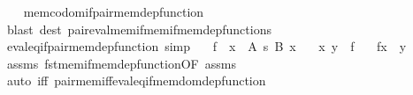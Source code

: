 \begin{isabellebody}
%
\isadelimproof
\ \ %
\endisadelimproof
%
\isatagproof
{}\isamarkupfalse%
\ mem{\isacharunderscore}{\kern0pt}codom{\isacharunderscore}{\kern0pt}if{\isacharunderscore}{\kern0pt}pair{\isacharunderscore}{\kern0pt}mem{\isacharunderscore}{\kern0pt}dep{\isacharunderscore}{\kern0pt}function\isanewline
\ \ \isamarkupfalse%
\ {\isacharparenleft}{\kern0pt}blast\ dest{\isacharcolon}{\kern0pt}\ pair{\isacharunderscore}{\kern0pt}eval{\isacharunderscore}{\kern0pt}mem{\isacharunderscore}{\kern0pt}if{\isacharunderscore}{\kern0pt}mem{\isacharunderscore}{\kern0pt}if{\isacharunderscore}{\kern0pt}mem{\isacharunderscore}{\kern0pt}dep{\isacharunderscore}{\kern0pt}functions{\isacharparenright}{\kern0pt}%
\endisatagproof
{\isafoldproof}%
%
\isadelimproof
\isanewline
%
\endisadelimproof
\isanewline
{}\isamarkupfalse%
\ eval{\isacharunderscore}{\kern0pt}eq{\isacharunderscore}{\kern0pt}if{\isacharunderscore}{\kern0pt}pair{\isacharunderscore}{\kern0pt}mem{\isacharunderscore}{\kern0pt}dep{\isacharunderscore}{\kern0pt}function\ {\isacharbrackleft}{\kern0pt}simp{\isacharbrackright}{\kern0pt}{\isacharcolon}{\kern0pt}\isanewline
\ \ \ {\isachardoublequoteopen}f\ {\isasymin}\ {\isacharparenleft}{\kern0pt}x\ {\isasymin}\ A{\isacharparenright}{\kern0pt}\ {\isasymrightarrow}s\ {\isacharparenleft}{\kern0pt}B\ x{\isacharparenright}{\kern0pt}{\isachardoublequoteclose}\isanewline
\ \ \ {\isachardoublequoteopen}{\isasymlangle}x{\isacharcomma}{\kern0pt}\ y{\isasymrangle}\ {\isasymin}\ f{\isachardoublequoteclose}\isanewline
\ \ \ {\isachardoublequoteopen}f{\isacharbackquote}{\kern0pt}x\ {\isacharequal}{\kern0pt}\ y{\isachardoublequoteclose}\isanewline
%
\isadelimproof
\ \ %
\endisadelimproof
%
\isatagproof
{}\isamarkupfalse%
\ assms\ fst{\isacharunderscore}{\kern0pt}mem{\isacharunderscore}{\kern0pt}if{\isacharunderscore}{\kern0pt}mem{\isacharunderscore}{\kern0pt}dep{\isacharunderscore}{\kern0pt}function{\isacharbrackleft}{\kern0pt}OF\ assms{\isacharbrackright}{\kern0pt}\isanewline
\ \ \ \ \isamarkupfalse%
\ {\isacharparenleft}{\kern0pt}auto\ iff{\isacharcolon}{\kern0pt}\ pair{\isacharunderscore}{\kern0pt}mem{\isacharunderscore}{\kern0pt}iff{\isacharunderscore}{\kern0pt}eval{\isacharunderscore}{\kern0pt}eq{\isacharunderscore}{\kern0pt}if{\isacharunderscore}{\kern0pt}mem{\isacharunderscore}{\kern0pt}dom{\isacharunderscore}{\kern0pt}dep{\isacharunderscore}{\kern0pt}function{\isacharparenright}{\kern0pt}%
\endisatagproof
{\isafoldproof}%
%
\isadelimproof
\isanewline
%
\endisadelimproof

\end{isabellebody}
